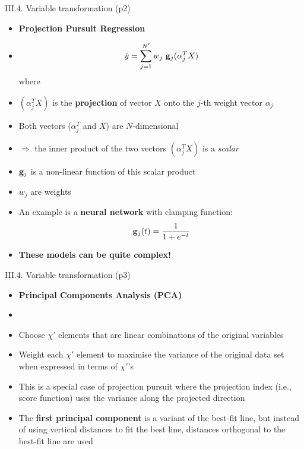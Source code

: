 \documentclass[handout]{beamer}
\newcommand{\strong}[1]{\textbf{\color{teal} #1}}
\newcommand{\stronger}[1]{\textbf{\color{purple} #1}}
\begin{document}
\begin{frame}{III.4. Variable transformation (p2)}
\begin{itemize}
\item[] \stronger{Projection Pursuit Regression}
\item[]
\[
\hat{y} = \sum_{j=1}^{N'}{ w_j ~ {\bf g}_j( \alpha_j^T X )}
\]
where 
\item $( \alpha_j^T X )$ is the \stronger{projection} of vector $X$ onto the $j$-th weight vector $\alpha_j$
\item Both vectors ($\alpha_j^T$ and $X$) are $N$-dimensional
\item[] $\Rightarrow$ the inner product of the two vectors $(\alpha_j^T X)$ is a \emph{scalar}
\item ${\bf g}_j$ is a non-linear function of this scalar product
\item $w_j$ are weights
\item An example is a \strong{neural network} with clamping function:
\[
{\bf g}_j(t) = \frac{1}{1 + e^{-t}}
\]
\item \strong{These models can be quite complex!}
\end{itemize}
\end{frame}
\begin{frame}{III.4. Variable transformation (p3)}
\begin{itemize}
\item[] \stronger{Principal Components Analysis (PCA)}
\item[]
\item Choose $\chi'$ elements that are linear combinations of the original variables
\item Weight each $\chi'$ element to maximise the variance of the original data set when expressed in terms of $\chi'$'s
\item This is a special case of projection pursuit where the projection index (i.e., score function) uses the variance along the projected direction
\item The \strong{first principal component} is a variant of the best-fit line, but instead of using vertical distances to fit the best line, distances orthogonal to the best-fit line are used
\end{itemize}
\end{frame}
\end{document}
